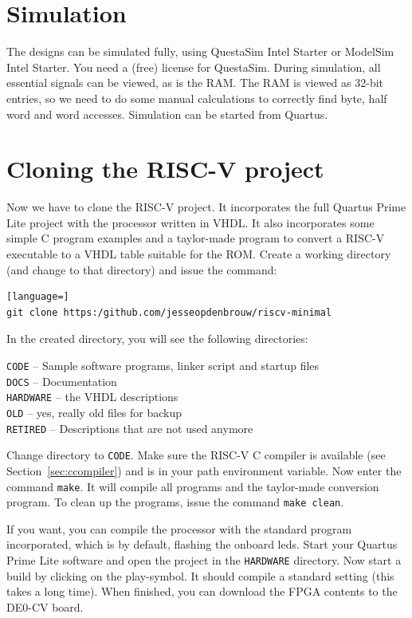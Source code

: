 \documentclass[12pt]{article}
\begin{document}
\section{Simulation}
The designs can be simulated fully, using QuestaSim Intel Starter or ModelSim Intel Starter. You need a (free) license for QuestaSim. During simulation, all essential signals can be viewed, as is the RAM. The RAM is viewed as 32-bit entries, so we need to do some manual calculations to correctly find byte, half word and word accesses. Simulation can be started from Quartus.

\section{Cloning the RISC-V project}
\label{sec:cloning}
Now we have to clone the RISC-V project. It incorporates the full Quartus Prime Lite project with the processor written in VHDL. It also incorporates some simple C program examples and a taylor-made program to convert a RISC-V executable to a VHDL table suitable for the ROM. Create a working directory (and change to that directory) and issue the command:

\begin{lstlisting}[language=]
git clone https:/github.com/jesseopdenbrouw/riscv-minimal
\end{lstlisting}

In the created directory, you will see the following directories:

\texttt{CODE} -- Sample software programs, linker script and startup files\\
\texttt{DOCS} -- Documentation\\
\texttt{HARDWARE} -- the VHDL descriptions \\
\texttt{OLD} -- yes, really old files for backup\\
\texttt{RETIRED} -- Descriptions that are not used anymore

Change directory to \texttt{CODE}. Make sure the RISC-V C compiler is available (see Section~\ref{sec:ccompiler}) and is in your path environment variable. Now enter the command \texttt{make}. It will compile all programs and the taylor-made conversion program. To clean up the programs, issue the command \texttt{make clean}.

If you want, you can compile the processor with the standard program incorporated, which is by default, flashing the onboard leds. Start your Quartus Prime Lite software and open the project in the \texttt{HARDWARE} directory. Now start a build by clicking on the play-symbol. It should compile a standard setting (this takes a long time). When finished, you can download the FPGA contents to the DE0-CV board.
\end{document}
